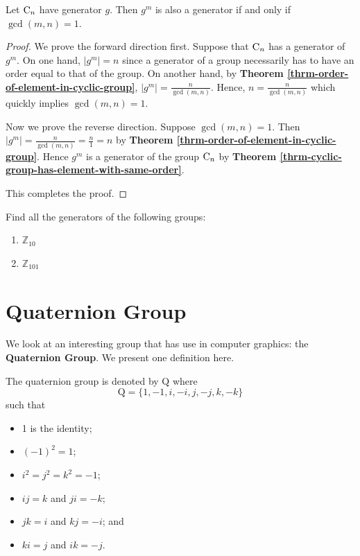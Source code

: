 \begin{corollary-thrm}
    Let $\mathrm{C}_{n}$ have generator $g$. Then $g^m$ is also a generator if and only if $\gcd(m, n) = 1$.
\end{corollary-thrm}
\begin{proof}
    We prove the forward direction first. Suppose that $\mathrm{C}_{n}$ has a generator of $g^m$. On one hand, $|g^m| = n$ since a generator of a group necessarily has to have an order equal to that of the group. On another hand, by \textbf{Theorem \ref{thrm-order-of-element-in-cyclic-group}}, $|g^m| = \frac{n}{\gcd(m, n)}$. Hence, $n = \frac{n}{\gcd(m, n)}$ which quickly implies $\gcd(m, n) = 1$.

    Now we prove the reverse direction. Suppose $\gcd(m,n) = 1$. Then $|g^m| = \frac{n}{\gcd(m,n)} = \frac{n}{1} = n$ by \textbf{Theorem \ref{thrm-order-of-element-in-cyclic-group}}. Hence $g^m$ is a generator of the group $\mathrm{C}_{n}$ by \textbf{Theorem \ref{thrm-cyclic-group-has-element-with-same-order}}.

    This completes the proof.
\end{proof}

\begin{exercise}
    Find all the generators of the following groups:
    \begin{enumerate}[label=(\alph*)]
        \item $\mathbb{Z}_{10}$
        \item $\mathbb{Z}_{101}$
    \end{enumerate}
\end{exercise}

\section{Quaternion Group}
We look at an interesting group that has use in computer graphics: the \textbf{Quaternion Group}. We present one definition here.
\begin{definition}
    The quaternion group is denoted by $\mathrm{Q}$ where
    \[
            \mathrm{Q} = \{1, -1, i, -i, j, -j, k, -k\}
    \]
    such that
    \begin{itemize}
        \item 1 is the identity;
        \item $(-1)^2 = 1$;
        \item $i^2 = j^2 = k^2 = -1$;
        \item $ij = k$ and $ji = -k$;
        \item $jk = i$ and $kj = -i$; and
        \item $ki = j$ and $ik = -j$.
    \end{itemize}
\end{definition}

